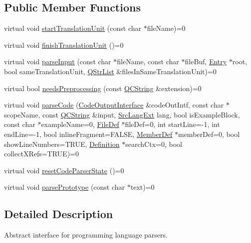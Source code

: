 \subsection*{Public Member Functions}
\begin{DoxyCompactItemize}
\item 
virtual void \mbox{\hyperlink{class_parser_interface_a72478f87ead5fde10d7d6bbe32a73024}{start\+Translation\+Unit}} (const char $\ast$file\+Name)=0
\item 
virtual void \mbox{\hyperlink{class_parser_interface_af3acd64c6a33852e2e46e7288eb9c9cf}{finish\+Translation\+Unit}} ()=0
\item 
virtual void \mbox{\hyperlink{class_parser_interface_a09ced377e619d40b7339187bad88341e}{parse\+Input}} (const char $\ast$file\+Name, const char $\ast$file\+Buf, \mbox{\hyperlink{class_entry}{Entry}} $\ast$root, bool same\+Translation\+Unit, \mbox{\hyperlink{class_q_str_list}{Q\+Str\+List}} \&files\+In\+Same\+Translation\+Unit)=0
\item 
virtual bool \mbox{\hyperlink{class_parser_interface_a36c669b17b64a6e3847f27d70a5398d2}{needs\+Preprocessing}} (const \mbox{\hyperlink{class_q_c_string}{Q\+C\+String}} \&extension)=0
\item 
virtual void \mbox{\hyperlink{class_parser_interface_a2ffc28f9dd7c47e2581376a573426395}{parse\+Code}} (\mbox{\hyperlink{class_code_output_interface}{Code\+Output\+Interface}} \&code\+Out\+Intf, const char $\ast$scope\+Name, const \mbox{\hyperlink{class_q_c_string}{Q\+C\+String}} \&input, \mbox{\hyperlink{types_8h_a9974623ce72fc23df5d64426b9178bf2}{Src\+Lang\+Ext}} lang, bool is\+Example\+Block, const char $\ast$example\+Name=0, \mbox{\hyperlink{class_file_def}{File\+Def}} $\ast$file\+Def=0, int start\+Line=-\/1, int end\+Line=-\/1, bool inline\+Fragment=F\+A\+L\+SE, \mbox{\hyperlink{class_member_def}{Member\+Def}} $\ast$member\+Def=0, bool show\+Line\+Numbers=T\+R\+UE, \mbox{\hyperlink{class_definition}{Definition}} $\ast$search\+Ctx=0, bool collect\+X\+Refs=T\+R\+UE)=0
\item 
virtual void \mbox{\hyperlink{class_parser_interface_aee4fccd1865a4e8a6b9f2896811104ca}{reset\+Code\+Parser\+State}} ()=0
\item 
virtual void \mbox{\hyperlink{class_parser_interface_a5ebf0f524a296845befa22c85a4cc80b}{parse\+Prototype}} (const char $\ast$text)=0
\end{DoxyCompactItemize}


\subsection{Detailed Description}
Abstract interface for programming language parsers. 

